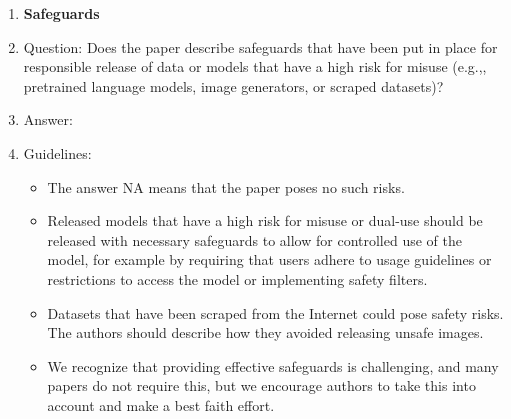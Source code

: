 \documentclass{article}
\theoremstyle{plain}
\theoremstyle{definition}
\theoremstyle{remark}
\begin{document}
\begin{enumerate}
\item {\bf Safeguards}
    \item[] Question: Does the paper describe safeguards that have been put in place for responsible release of data or models that have a high risk for misuse (e.g.,, pretrained language models, image generators, or scraped datasets)?
    \item[] Answer: \answerNA{} %
    \item[] Guidelines:
    \begin{itemize}
        \item The answer NA means that the paper poses no such risks.
        \item Released models that have a high risk for misuse or dual-use should be released with necessary safeguards to allow for controlled use of the model, for example by requiring that users adhere to usage guidelines or restrictions to access the model or implementing safety filters. 
        \item Datasets that have been scraped from the Internet could pose safety risks. The authors should describe how they avoided releasing unsafe images.
        \item We recognize that providing effective safeguards is challenging, and many papers do not require this, but we encourage authors to take this into account and make a best faith effort.
    \end{itemize}


\end{enumerate}
\end{document}

